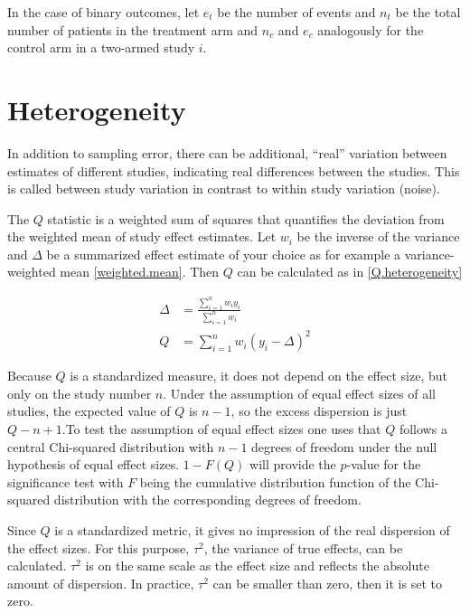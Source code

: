\documentclass[11pt,a4paper,twoside]{book}\usepackage[]{graphicx}\usepackage[]{color}
\begin{document}
\vspace{0mm}
In the case of binary outcomes, let $e_{t}$ be the number of events and $n_{t}$ be the total number of patients in the treatment arm and $n_{c}$ and $e_{c}$ analogously for the control arm in a two-armed study $i$. 

\section{Heterogeneity}
In addition to sampling error, there can be additional, ``real'' variation between estimates of different studies, indicating real differences between the studies. This is called between study variation in contrast to within study variation (noise). 

\vspace{0mm}
The $Q$ statistic is a weighted sum of squares that quantifies the deviation from the weighted mean of study effect estimates. Let $w_i$ be the inverse of the variance and $\Delta$ be a summarized effect estimate of your choice as for example a variance-weighted mean \ref{weighted.mean}. Then $Q$ can be calculated as in \ref{Q.heterogeneity}

\begin{align}
\Delta &= \frac{\sum_{i = 1}^n w_{i}y_{i}}{\sum_{i = 1}^n w_{i}} \label{weighted.mean} \\
Q &= \sum_{i = 1}^n w_{i}(y_{i} - \Delta)^2 \label{Q.heterogeneity}
\end{align}

Because $Q$ is a standardized measure, it does not depend on the effect size, but only on the study number $n$. Under the assumption of equal effect sizes of all studies, the expected value of $Q$ is $n-1$, so the excess dispersion is just $Q - n + 1$.To test the assumption of equal effect sizes one uses that $Q$ follows a central Chi-squared distribution with $n -1$ degrees of freedom under the null hypothesis of equal effect sizes. $1 - F(Q)$ will provide the $p$-value for the significance test with $F$ being the cumulative distribution function of the Chi-squared distribution with the corresponding degrees of freedom.

\vspace{0mm}
Since $Q$ is a standardized metric, it gives no impression of the real dispersion of the effect sizes. For this purpose, $\tau^2$, the variance of true effects, can be calculated. $\tau^2$ is on the same scale as the effect size and reflects the absolute amount of dispersion. In practice, $\tau^2$ can be smaller than zero, then it is set to zero.
\end{document}
